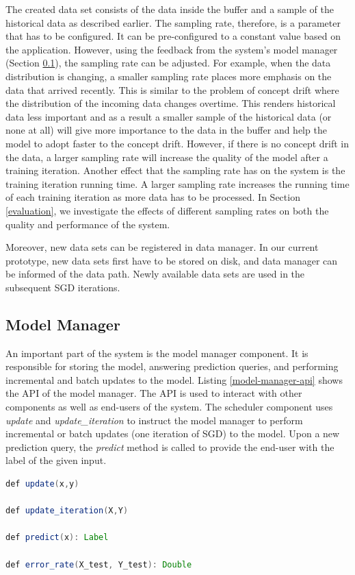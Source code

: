 \documentclass{vldb}
\begin{document}
The created data set consists of the data inside the buffer and a sample of the historical data as described earlier.
The sampling rate, therefore, is a parameter that has to be configured.
It can be pre-configured to a constant value based on the application.
However, using the feedback from the system's model manager (Section \ref{model-manager}), the sampling rate can be adjusted.
For example, when the data distribution is changing, a smaller sampling rate places more emphasis on the data that arrived recently. 
This is similar to the problem of concept drift where the distribution of the incoming data changes overtime.
This renders historical data less important and as a result a smaller sample of the historical data (or none at all) will give more importance to the data in the buffer and help the model to adopt faster to the concept drift.
However, if there is no concept drift in the data, a larger sampling rate will increase the quality of the model after a training iteration.
Another effect that the sampling rate has on the system is the training iteration running time.
A larger sampling rate increases the running time of each training iteration as more data has to be processed.
In Section \ref{evaluation}, we investigate the effects of different sampling rates on both the quality and performance of the system.

Moreover,  new data sets can be registered in data manager.
In our current prototype, new data sets first have to be stored on disk, and data manager can be informed of the data path.
Newly available data sets are used in the subsequent SGD iterations.

\subsection{Model Manager} \label{model-manager} 
An important part of the system is the model manager component.
It is responsible for storing the model, answering prediction queries, and performing incremental and batch updates to the model.
Listing \ref{model-manager-api} shows the API of the model manager.
The API is used to interact with other components as well as end-users of the system.
The scheduler component uses \textit{update} and \textit{update\_iteration} to instruct the model manager to perform incremental or batch updates (one iteration of SGD) to the model.
Upon a new prediction query, the \textit{predict} method is called to provide the end-user with the label of the given input.

\noindent\begin{minipage}[t]{\linewidth}
\begin{lstlisting}[language=java, basicstyle=\small\ttfamily, frame=tb ,columns=fullflexible,
showstringspaces=false,label=model-manager-api,caption=Model Manager API, numberstyle=\tiny]
def update(x,y)

def update_iteration(X,Y)

def predict(x): Label

def error_rate(X_test, Y_test): Double

\end{lstlisting}
\end{minipage}
\end{document}
